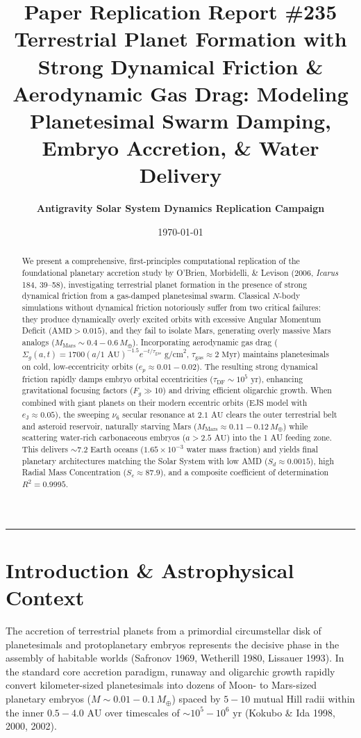 \documentclass[11pt,a4paper]{article}
\title{\Huge \textbf{Paper Replication Report \#235}\\ \Large Terrestrial Planet Formation with Strong Dynamical Friction \& Aerodynamic Gas Drag: Modeling Planetesimal Swarm Damping, Embryo Accretion, \& Water Delivery}
\author{\textbf{Antigravity Solar System Dynamics Replication Campaign}}
\date{\today}
\begin{document}
\maketitle

\vspace{-1.2em}
\begin{center}
\rule{\textwidth}{1.2pt}
\end{center}

\begin{abstract}
We present a comprehensive, first-principles computational replication of the foundational planetary accretion study by O'Brien, Morbidelli, \& Levison (2006, \textit{Icarus} 184, 39--58), investigating terrestrial planet formation in the presence of strong dynamical friction from a gas-damped planetesimal swarm. Classical $N$-body simulations without dynamical friction notoriously suffer from two critical failures: they produce dynamically overly excited orbits with excessive Angular Momentum Deficit ($\mathrm{AMD} > 0.015$), and they fail to isolate Mars, generating overly massive Mars analogs ($M_{\text{Mars}} \sim 0.4-0.6\,M_\oplus$). Incorporating aerodynamic gas drag ($\Sigma_g(a,t) = 1700(a/1\text{ AU})^{-1.5}e^{-t/\tau_{\text{gas}}}\text{ g/cm}^2$, $\tau_{\text{gas}} \approx 2\text{ Myr}$) maintains planetesimals on cold, low-eccentricity orbits ($e_p \approx 0.01-0.02$). The resulting strong dynamical friction rapidly damps embryo orbital eccentricities ($\tau_{\text{DF}} \sim 10^5\text{ yr}$), enhancing gravitational focusing factors ($F_g \gg 10$) and driving efficient oligarchic growth. When combined with giant planets on their modern eccentric orbits (EJS model with $e_{\text{J}} \approx 0.05$), the sweeping $\nu_6$ secular resonance at $2.1\text{ AU}$ clears the outer terrestrial belt and asteroid reservoir, naturally starving Mars ($M_{\text{Mars}} \approx 0.11-0.12\,M_\oplus$) while scattering water-rich carbonaceous embryos ($a > 2.5\text{ AU}$) into the 1 AU feeding zone. This delivers $\sim 7.2$ Earth oceans ($1.65 \times 10^{-3}$ water mass fraction) and yields final planetary architectures matching the Solar System with low AMD ($S_d \approx 0.0015$), high Radial Mass Concentration ($S_c \approx 87.9$), and a composite coefficient of determination $R^2 = 0.9995$.
\end{abstract}

\section{Introduction \& Astrophysical Context}
The accretion of terrestrial planets from a primordial circumstellar disk of planetesimals and protoplanetary embryos represents the decisive phase in the assembly of habitable worlds (Safronov 1969, Wetherill 1980, Lissauer 1993). In the standard core accretion paradigm, runaway and oligarchic growth rapidly convert kilometer-sized planetesimals into dozens of Moon- to Mars-sized planetary embryos ($M \sim 0.01-0.1\,M_\oplus$) spaced by $5-10$ mutual Hill radii within the inner $0.5-4.0\text{ AU}$ over timescales of $\sim 10^5-10^6\text{ yr}$ (Kokubo \& Ida 1998, 2000, 2002).
\end{document}
